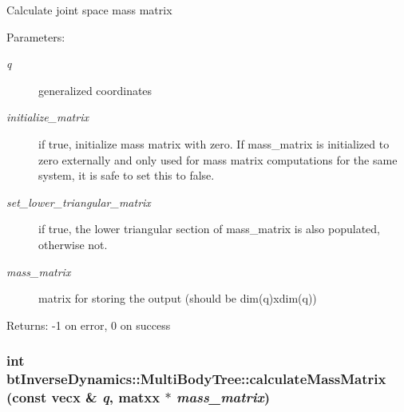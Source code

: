 Calculate joint space mass matrix \begin{Desc}
\item[Parameters:]
\begin{description}
\item[{\em q}]generalized coordinates \item[{\em initialize\_\-matrix}]if true, initialize mass matrix with zero. If mass\_\-matrix is initialized to zero externally and only used for mass matrix computations for the same system, it is safe to set this to false. \item[{\em set\_\-lower\_\-triangular\_\-matrix}]if true, the lower triangular section of mass\_\-matrix is also populated, otherwise not. \item[{\em mass\_\-matrix}]matrix for storing the output (should be dim(q)xdim(q)) \end{description}
\end{Desc}
\begin{Desc}
\item[Returns:]-1 on error, 0 on success \end{Desc}
\hypertarget{classbt_inverse_dynamics_1_1_multi_body_tree_07b710ad4cbbe4cdadd8e2b5ad7c854a}{
\subsubsection[calculateMassMatrix]{\setlength{\rightskip}{0pt plus 5cm}int btInverseDynamics::MultiBodyTree::calculateMassMatrix (const vecx \& {\em q}, \/  matxx $\ast$ {\em mass\_\-matrix})}}
\label{classbt_inverse_dynamics_1_1_multi_body_tree_07b710ad4cbbe4cdadd8e2b5ad7c854a}


